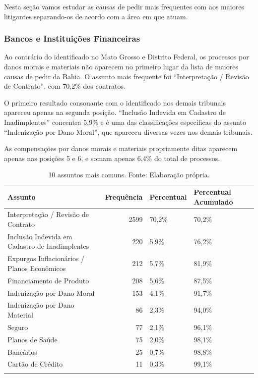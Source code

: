 \documentclass[]{report}
\begin{document}
Nesta seção vamos estudar as causas de pedir mais frequentes com aos
maiores litigantes separando-os de acordo com a área em que atuam.

\subsubsection{Bancos e Instituições
Financeiras}\label{bancos-e-instituicoes-financeiras-5}

Ao contrário do identificado no Mato Grosso e Distrito Federal, os
processos por danos morais e materiais não aparecem no primeiro lugar da
lista de maiores causas de pedir da Bahia. O assunto mais frequente foi
``Interpretação / Revisão de Contrato'', com 70,2\% dos contratos.

O primeiro resultado consonante com o identificado nos demais tribunais
apareceu apenas na segunda posição. ``Inclusão Indevida em Cadastro de
Inadimplentes'' concentra 5,9\% e é uma das classificações específicas
do assunto ``Indenização por Dano Moral'', que apareceu diversas vezes
nos demais tribunais.

As compensações por danos morais e materiais propriamente ditas aparecem
apenas nas posições 5 e 6, e somam apenas 6,4\% do total de processos.

\begin{longtable}{lrll}
\caption{10 assuntos mais comuns. Fonte: Elaboração própria.} \\
  \hline
Assunto & Frequência & Percentual & Percentual Acumulado \\
  \hline
Interpretação / Revisão de Contrato & 2599 & 70,2\% & 70,2\% \\
  Inclusão Indevida em Cadastro de Inadimplentes & 220 & 5,9\% & 76,2\% \\
  Expurgos Inflacionários / Planos Econômicos & 212 & 5,7\% & 81,9\% \\
  Financiamento de Produto & 208 & 5,6\% & 87,5\% \\
  Indenização por Dano Moral & 153 & 4,1\% & 91,7\% \\
  Indenização por Dano Material &  86 & 2,3\% & 94,0\% \\
  Seguro &  77 & 2,1\% & 96,1\% \\
  Planos de Saúde &  75 & 2,0\% & 98,1\% \\
  Bancários &  25 & 0,7\% & 98,8\% \\
  Cartão de Crédito &  11 & 0,3\% & 99,1\% \\
   \hline
\hline
\label{unnamed-chunk-69}
\end{longtable}
\end{document}
